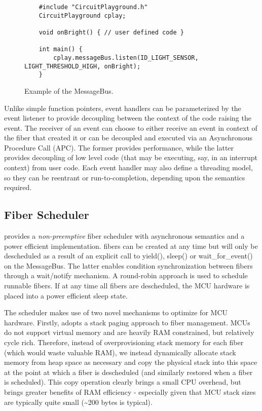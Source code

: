 \begin{figure}[t]
    \begin{lstlisting}
    #include "CircuitPlayground.h"
    CircuitPlayground cplay;

    void onBright() { // user defined code }

    int main() {
        cplay.messageBus.listen(ID_LIGHT_SENSOR, LIGHT_THRESHOLD_HIGH, onBright);
    }
    \end{lstlisting}
    \caption{\label{fig:messageBus}Example of the \CO MessageBus.}
\end{figure}

Unlike simple function pointers, \CO event handlers can be parameterized by the event listener to provide decoupling between the context of the code raising the event. The receiver of an event can choose to either receive an event in context of the fiber that created it or can be decoupled and executed via an Asynchronous Procedure Call (APC). The former provides performance, while the latter provides decoupling of low level code (that may be executing, say, in an interrupt context) from user code. Each event handler may also define a threading model, so they can be reentrant or run-to-completion, depending upon the semantics required.

\subsection{Fiber Scheduler}
\CO provides a \emph{non-preemptive} fiber scheduler with asynchronous semantics and a power efficient implementation. \CO fibers can be created at any time but will only be descheduled as a result of an explicit call to yield(), sleep() or wait\_for\_event() on the MessageBus. The latter enables condition synchronization between fibers through a wait/notify mechanism. A round-robin approach is used to schedule runnable fibers. If at any time all fibers are descheduled, the MCU hardware is placed into a power efficient sleep state.

The \CO scheduler makes use of two novel mechanisms to optimize for MCU hardware. Firstly, \CO adopts a stack paging approach to fiber management. MCUs do not support virtual memory and are heavily RAM constrained, but relatively cycle rich. Therefore, instead of overprovisioning stack memory for each fiber (which would waste valuable RAM), we instead dynamically allocate stack memory from heap space as necessary and copy the physical stack into this space at the point at which a fiber is descheduled (and similarly restored when a fiber is scheduled). This copy operation clearly brings a small CPU overhead, but brings greater benefits of RAM efficiency - especially given that MCU stack sizes are typically quite small (\textasciitilde200 bytes is typical).

